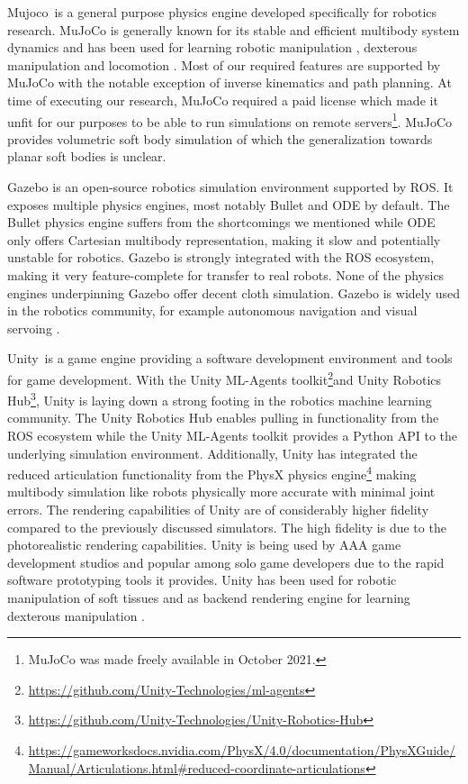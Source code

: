 \documentclass[\home/main.tex]{subfiles}
\begin{document}
Mujoco\textregistered~is a general purpose physics engine developed specifically for robotics research. MuJoCo is generally known for its stable and efficient multibody system dynamics \autocite{Erez2015} and has been used for learning robotic manipulation \autocite{rajeswaran2017learning}, dexterous manipulation \autocite{openai2019solving} and locomotion \autocite{heess2017emergence}. Most of our required features are supported by MuJoCo with the notable exception of inverse kinematics and path planning. At time of executing our research, MuJoCo required a paid license which made it unfit for our purposes to be able to run simulations on remote servers\footnote{MuJoCo was made freely available in October 2021.}. MuJoCo provides volumetric soft body simulation of which the generalization towards planar soft bodies is unclear. 

Gazebo is an open-source robotics simulation environment supported by ROS. It exposes multiple physics engines, most notably Bullet and ODE by default. The Bullet physics engine suffers from the shortcomings we mentioned while ODE only offers Cartesian multibody representation, making it slow and potentially unstable for robotics. Gazebo is strongly integrated with the ROS ecosystem, making it very feature-complete for transfer to real robots. None of the physics engines underpinning Gazebo offer decent cloth simulation. Gazebo is widely used in the robotics community, for example autonomous navigation \autocite{Imanberdiyev2016} and visual servoing \autocite{Shi2018}.

Unity\textregistered~is a game engine providing a software development environment and tools for game development. With the Unity ML-Agents toolkit\footnote{\url{https://github.com/Unity-Technologies/ml-agents}}and Unity Robotics Hub\footnote{\url{https://github.com/Unity-Technologies/Unity-Robotics-Hub}}, Unity is laying down a strong footing in the robotics machine learning community. The Unity Robotics Hub enables pulling in functionality from the ROS ecosystem while the Unity ML-Agents toolkit provides a Python API to the underlying simulation environment. Additionally, Unity has integrated the reduced articulation functionality from the PhysX physics engine\footnote{\url{https://gameworksdocs.nvidia.com/PhysX/4.0/documentation/PhysXGuide/Manual/Articulations.html\#reduced-coordinate-articulations}} making multibody simulation like robots physically more accurate with minimal joint errors. The rendering capabilities of Unity are of considerably higher fidelity compared to the previously discussed simulators. The high fidelity is due to the photorealistic rendering capabilities. Unity is being used by AAA game development studios and popular among solo game developers due to the rapid software prototyping tools it provides. Unity has been used for robotic manipulation of soft tissues \autocite{Tagliabue2020} and as backend rendering engine for learning dexterous manipulation \autocite{openai2019solving}. 
\end{document}
